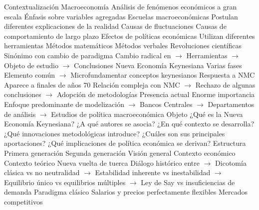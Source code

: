 \documentclass{nuevotema}
\begin{document}
\esquemalargo























\begin{esquemal}
	\1[] 
		\2 Contextualización
			\3 Macroeconomía
				\4 Análisis de fenómenos económicos a gran escala
				\4 Énfasis sobre variables agregadas
			\3 Escuelas macroeconómicas
				\4 Postulan diferentes explicaciones de la realidad
				\4[] Causas de fluctuaciones
				\4[] Causas de comportamiento de largo plazo
				\4[] Efectos de políticas económicas
				\4 Utilizan diferentes herramientas
				\4[] Métodos matemáticos
				\4[] Métodos verbales
				\4 Revoluciones científicas
				\4[] Sinónimo con cambio de paradigma
				\4[] Cambio radical en
				\4[] $\to$ Herramientas
				\4[] $\to$ Objeto de estudio
				\4[] $\to$ Conclusiones
			\3 Nueva Economía Keynesiana
				\4 Varias fases
				\4[] Elemento común
				\4[] $\to$ Microfundamentar conceptos keynesianos
				\4 Respuesta a NMC
				\4[] Aparece a finales de años 70
				\4[] Relación compleja con NMC
				\4[] $\to$ Rechazo de algunas conclusiones
				\4[] $\to$ Adopción de metodologías
				\4 Presencia actual
				\4[] Enorme importancia
				\4[] Enfoque predominante de modelización
				\4[] $\to$ Bancos Centrales
				\4[] $\to$ Departamentos de análisis
				\4[] $\to$ Estudios de política macroeconómica
		\2 Objeto
			\3 ¿Qué es la Nueva Economía Keynesiana?
			\3 ¿A qué autores se asocia?
			\3 ¿En qué contexto se desarrolla?
			\3 ¿Qué innovaciones metodológicas introduce?
			\3 ¿Cuáles son sus principales aportaciones?
			\3 ¿Qué implicaciones de política económica se derivan?
		\2 Estructura
			\3 Primera generación
			\3 Segunda generación
	\1 
		\2 Visión general
			\3 Contexto económico
			\3 Contexto teórico
				\4 Nueva vuelta de tuerca
				\4[] Diálogo histórico entre
				\4[] $\to$ Dicotomía clásica vs no neutralidad
				\4[] $\to$ Estabilidad inherente vs inestabilidad
				\4[] $\to$ Equilibrio único vs equilibrios múltiples
				\4[] $\to$ Ley de Say vs insuficiencias de demanda
				\4 Paradigma clásico
				\4[] Salarios y precios perfectamente flexibles
				\4[] Mercados competitivos

\end{esquemal}
\end{document}
